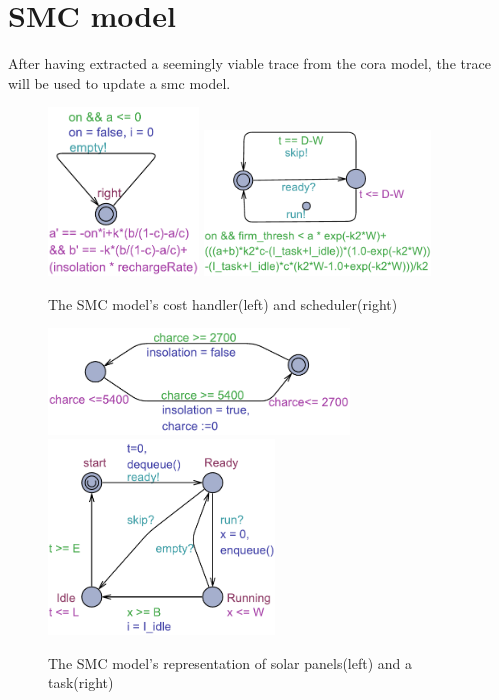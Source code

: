 \section{SMC model}
After having extracted a seemingly viable trace from the \gls{cora} model, the trace will be used to update a \gls{smc} model. 


\begin{figure}[H]%
	\centering
	\subfloat
	{{\includegraphics[width=4cm]{graphics/smc_costhandler.pdf} }}%
	\qquad
	\subfloat
	{{\includegraphics[width=6cm]{graphics/smc_scheduler.pdf} }}%
	\caption{The SMC model's cost handler(left) and scheduler(right)}%
	\label{fig:cost_schedule}%
\end{figure}

\begin{figure}[H]%
	\centering
	\subfloat
	{{\includegraphics[width=8cm]{graphics/smc_solar.pdf} }}%
	\qquad
	\subfloat
	{{\includegraphics[width=6cm]{graphics/smc_task.pdf} }}%
	\caption{The SMC model's representation of solar panels(left) and a task(right)}%
	\label{fig:solar_task}%
\end{figure}